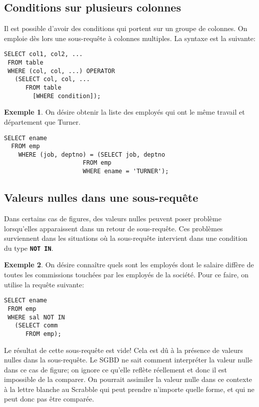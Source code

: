 \documentclass[a4paper, 12pt]{report}
\newcommand{\textSQL}[1]{\texttt{\textbf{#1}}}
\theoremstyle{definition} \newtheorem{ex}{Exemple}
\begin{document}
\subsection{Conditions sur plusieurs colonnes}
Il est possible d'avoir des conditions qui portent sur un groupe de colonnes. On emploie dès lors une sous-requête à colonnes multiples. La syntaxe est la suivante:
\begin{lstlisting}[frame=single]
SELECT col1, col2, ...
 FROM table
 WHERE (col, col, ...) OPERATOR
   (SELECT col, col, ...
	  FROM table
		[WHERE condition]);
\end{lstlisting}
\begin{ex}
On désire obtenir la liste des employés qui ont le même travail et département que Turner.
	\begin{lstlisting}[frame=single]
SELECT ename
  FROM emp
	WHERE (job, deptno) = (SELECT job, deptno
		              FROM emp
		              WHERE ename = 'TURNER');
	\end{lstlisting}
\end{ex}

\subsection{Valeurs nulles dans une sous-requête}
Dans certains cas de figures, des valeurs nulles peuvent poser problème lorsqu'elles apparaissent dans un retour de sous-requête. Ces problèmes surviennent dans les situations où la sous-requête intervient dans une condition du type \textSQL{NOT IN}.

\begin{ex}
On désire connaître quels sont les employés dont le salaire diffère de toutes les commissions touchées par les employés de la société. Pour ce faire, on utilise la requête suivante:
\begin{lstlisting}[frame=single]
SELECT ename
 FROM emp
 WHERE sal NOT IN
   (SELECT comm
	  FROM emp);
\end{lstlisting}

Le résultat de cette sous-requête est vide! Cela est dû à la présence de valeurs nulles dans la sous-requête. Le SGBD ne sait comment interpréter la valeur nulle dans ce cas de figure; on ignore ce qu'elle reflète réellement et donc il est impossible de la comparer. On pourrait assimiler la valeur nulle dans ce contexte à  la lettre blanche au Scrabble qui peut prendre n'importe quelle forme, et qui ne peut donc pas être comparée. 
\end{ex}
\end{document}
